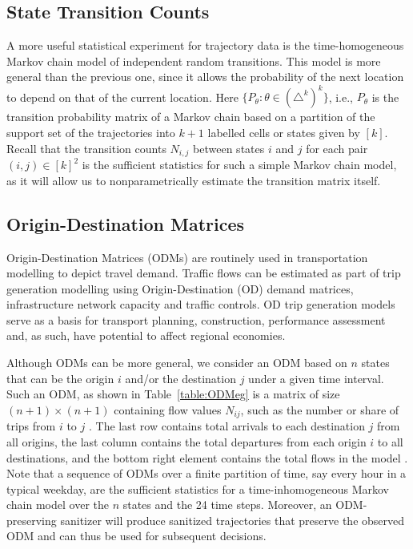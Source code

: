 \documentclass[times,twocolumn,final,authoryear]{elsarticle}
\begin{document}
\subsection{State Transition Counts}
A more useful statistical experiment for trajectory data is the time-homogeneous Markov chain model of independent random transitions. This model is more general than the previous one, since it allows the probability of the next location to depend on that of the current location.   
Here $\{P_{\theta}: \theta \in (\triangle^k)^k\}$, i.e., $P_{\theta}$ is the transition probability matrix of a Markov chain based on a partition of the support set of the trajectories into $k+1$ labelled cells or states given by $[k]$.  
Recall that the transition counts $N_{i,j}$ between states $i$ and $j$ for each pair $(i,j) \in [k]^2$ is the sufficient statistics for such a simple Markov chain model, as it will allow us to nonparametrically estimate the transition matrix itself.  

\subsection{Origin-Destination Matrices}
Origin-Destination Matrices (ODMs) are routinely used in transportation modelling to depict travel demand.  
Traffic flows can be estimated as part of trip generation modelling using Origin-Destination (OD) demand matrices, infrastructure network capacity and traffic controls. 
OD trip generation models serve as a basis for transport planning, construction, performance assessment and, as such, have potential to affect regional economies. 

Although ODMs can be more general, we consider an ODM based on $n$ states that can be the origin $i$ and/or the destination $j$ under a given time interval. 
Such an ODM, as shown in Table~\ref{table:ODMeg} is a matrix of size $(n+1) \times (n+1)$ containing flow values $N_{ij}$, such as the number or share of trips from $i$ to $j$ \citep{Rodrigue2009}.  
The last row contains total arrivals to each destination $j$ from all origins, the last column contains the total departures from each origin $i$ to all destinations, and the bottom right element contains the total flows in the model 
\citep{EVANS1970}. 
Note that a sequence of ODMs over a finite partition of time, say every hour in a typical weekday, are the sufficient statistics for a time-inhomogeneous Markov chain model over the $n$ states and the 24 time steps. 
Moreover, an ODM-preserving sanitizer will produce sanitized trajectories that preserve the observed ODM and can thus be used for subsequent decisions.
\end{document}
